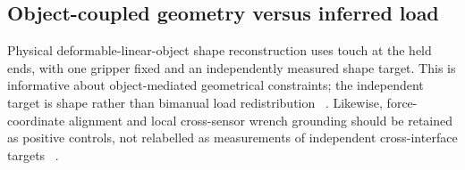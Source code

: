 \subsection{Object-coupled geometry versus inferred load}

Physical deformable-linear-object shape reconstruction uses touch at the held
ends, with one gripper fixed and an independently measured shape target.
This is informative about object-mediated geometrical constraints; the
independent target is shape rather than bimanual load redistribution
~\cite{nov18dlotactileshape}. Likewise, force-coordinate alignment and
local cross-sensor wrench grounding should be retained as positive controls,
not relabelled as measurements of independent cross-interface targets
~\cite{nov18dexremo,nov18taffoundation}.
